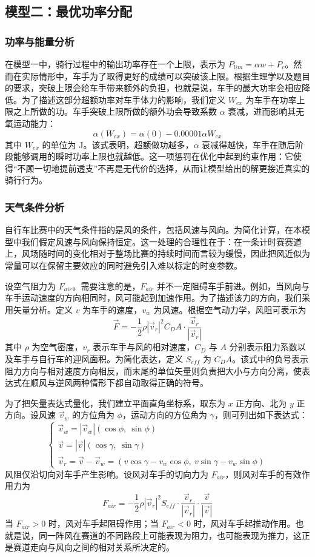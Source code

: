 \documentclass[11pt,a4paper]{ctexart}
\begin{document}
\subsection{模型二：最优功率分配}

\subsubsection{功率与能量分析}

在模型一中，骑行过程中的输出功率存在一个上限，表示为 $P_{lim}=\alpha w+P_c$。然而在实际情形中，车手为了取得更好的成绩可以突破该上限。根据生理学以及题目的要求，突破上限会给车手带来额外的负担，也就是说，车手的最大功率会相应降低。为了描述这部分超额功率对车手体力的影响，我们定义 $W_{ex}$ 为车手在功率上限之上所做的功。车手突破上限所做的额外功会导致系数 $\alpha$ 衰减，进而影响其无氧运动能力：
\[
\alpha(W_{ex})=\alpha(0)-0.00001\alpha W_{ex}
\]
其中 $W_{ex}$ 的单位为 J。该式表明，超额做功越多，$\alpha$ 衰减得越快，车手在随后阶段能够调用的瞬时功率上限也就越低。这一项惩罚在优化中起到约束作用：它使得“不顾一切地提前透支”不再是无代价的选择，从而让模型给出的解更接近真实的骑行行为。

\subsubsection{天气条件分析}

自行车比赛中的天气条件指的是风的条件，包括风速与风向。为简化计算，在本模型中我们假定风速与风向保持恒定。这一处理的合理性在于：在一条计时赛赛道上，风场随时间的变化相对于整场比赛的持续时间而言较为缓慢，因此把风近似为常量可以在保留主要效应的同时避免引入难以标定的时变参数。

设空气阻力为 $F_{air}$。需要注意的是，$F_{air}$ 并不一定阻碍车手前进。例如，当风向与车手运动速度的方向相同时，风可能起到加速作用。为了描述该力的方向，我们采用矢量分析。定义 $v$ 为车手的速度，$v_w$ 为风速。根据空气动力学，风阻可表示为
\[
\vec{F}=-\frac{1}{2}\rho|\vec{v}_r|^2 C_D A\cdot\frac{\vec{v}_r}{|\vec{v}_r|}
\]
其中 $\rho$ 为空气密度，$v_r$ 表示车手与风的相对速度，$C_D$ 与 $A$ 分别表示阻力系数以及车手与自行车的迎风面积。为简化表达，定义 $S_{eff}$ 为 $C_D A$。该式中的负号表示阻力方向与相对速度方向相反，而末尾的单位矢量则负责把大小与方向分离，使表达式在顺风与逆风两种情形下都自动取得正确的符号。

为了把矢量表达式量化，我们建立平面直角坐标系，取东为 $x$ 正方向、北为 $y$ 正方向。设风速 $\vec{v}_w$ 的方位角为 $\phi$，运动方向的方位角为 $\gamma$，则可列出如下表达式：
\[
\begin{cases}
\vec{v}_w=|\vec{v}_w|(\cos\phi,\ \sin\phi)\\[0.3em]
\vec{v}=|\vec{v}|(\cos\gamma,\ \sin\gamma)\\[0.3em]
\vec{v}_r=\vec{v}-\vec{v}_w=(v\cos\gamma-v_w\cos\phi,\ v\sin\gamma-v_w\sin\phi)
\end{cases}
\]
风阻仅沿切向对车手产生影响。设风对车手的切向力为 $F_{air}$，则风对车手的有效作用力为
\[
F_{air}=-\frac{1}{2}\rho|\vec{v}_r|^2 S_{eff}\cdot\frac{\vec{v}_r}{|\vec{v}_r|}\cdot\frac{\vec{v}}{|\vec{v}|}
\]
当 $F_{air}>0$ 时，风对车手起阻碍作用；当 $F_{air}<0$ 时，风对车手起推动作用。也就是说，同一阵风在赛道的不同路段上可能表现为阻力，也可能表现为推力，这正是赛道走向与风向之间的相对关系所决定的。
\end{document}
